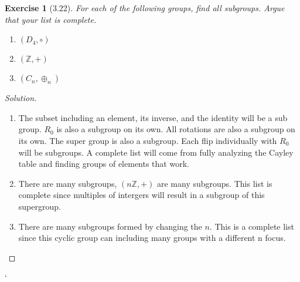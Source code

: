 \documentclass{article}
\newtheorem*{ex}{Exercise}
\newenvironment{solution}
  {\begin{proof}[Solution]}
  {\renewcommand{\qedsymbol}{}\end{proof}}
\begin{document}
\begin{ex}[3.22]
	For each of the following groups, find all subgroups. Argue that
	your list is complete.

	\begin{enumerate}
	  \item $(D_4, \circ)$
	  \item $(\mathbb{Z}, +)$
	  \item $(C_n, \oplus_n)$
	\end{enumerate}
\end{ex}
\begin{solution}
	\begin{enumerate}
	  \item The subset including an element, its inverse, and the identity
	    will be a sub group. $R_0$ is also a subgroup on its own.
	    All rotations are also a subgroup on its own. The super group
	    is also a subgroup. Each flip individually with $R_0$ will
	    be subgroups. A complete list will come from fully analyzing 
	    the Cayley table and finding groups of elements that work.
	  \item There are many subgroups, $(n\mathbb{Z}, +)$ are many subgroups. 
	    This list is complete since multiples of intergers will result
	    in a subgroup of this supergroup.
	  \item There are many subgroups formed by changing the $n$. 
	    This is a complete list since this cyclic group
	    can including many groups with a different n focus. 
	\end{enumerate}


\end{solution}`
\end{document}
